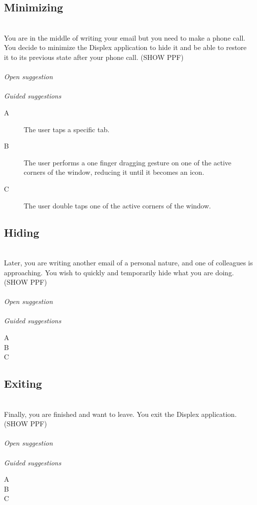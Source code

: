 \documentclass[11pt]{amsart}
\begin{document}
\subsection{Minimizing}
\hfill\\
You are in the middle of writing your email but you need to make a phone call. You decide to minimize the Displex application to hide it and be able to restore it to its previous state after your phone call.
(SHOW PPF)
\\\\
\emph{Open suggestion}
\\\\
\emph{Guided suggestions}
\begin{description}
\item[A]{The user taps a specific tab.}
\item[B]{The user performs a one finger dragging gesture on one of the active corners of the window, reducing it until it becomes an icon.}
\item[C]{The user double taps one of the active corners of the window.}
\end{description}

\subsection{Hiding}
\hfill\\
Later, you are writing another email of a personal nature, and one of colleagues is approaching. You wish to quickly and temporarily hide what you are doing.
(SHOW PPF)
\\\\
\emph{Open suggestion}
\\\\
\emph{Guided suggestions}
\begin{description}
\item[A]
\item[B]
\item[C]
\end{description}

\subsection{Exiting}
\hfill\\
Finally, you are finished and want to leave. You exit the Displex application.
(SHOW PPF)
\\\\
\emph{Open suggestion}
\\\\
\emph{Guided suggestions}
\begin{description}
\item[A]
\item[B]
\item[C]
\end{description}
\end{document}

